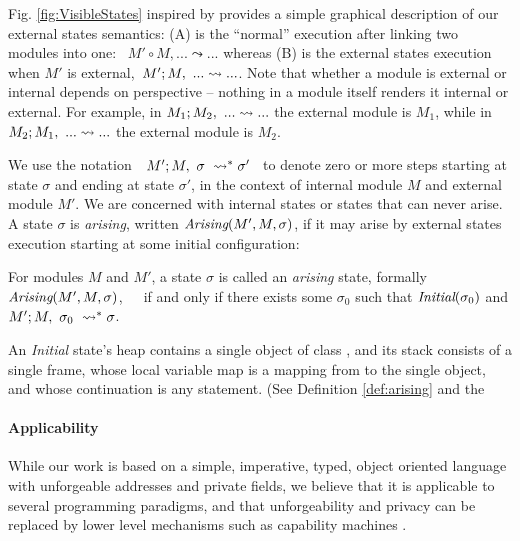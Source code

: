 Fig. \ref{fig:VisibleStates} inspired by  provides a simple graphical description of 
our external states semantics: (A) is the ``normal'' execution after 
linking two modules into one: \ $M' \circ M, ... \leadsto ...$ whereas (B) is the
 external states execution when $M'$ is external,\   $M' ; M,\ ... \leadsto ...$.
Note that whether a module is external or internal depends on %
perspective -- nothing in a module itself renders it internal or external. For example, in
 $M_1 ; M_2,\ ... \leadsto ...$ the external module is $M_1$,
  while in  $M_2 ; M_1,\ ... \leadsto ...$  the external module is $M_2$.

We  use the notation\ \  $M' ; M,\ \sigma\ \leadsto^* \sigma'$ \ 
to denote zero or more  steps starting at state $\sigma$ and ending at state $\sigma'$, in the context of internal module 
$M$ and external module $M'$.
We are \jm[]{not} concerned with internal states or states that can never arise.
{A state $\sigma$ is \emph{arising},}  written $\textit{Arising}(M', M, \sigma)$, {if it  may arise by external states} execution
starting at some initial configuration:



\begin{definition}
\label{def:arising}
For   modules $M$ and  $M'$, a %
 state $\sigma$ is 
called an \emph{arising} state, formally \ \ \ $\textit{Arising}(M', M, \sigma)$,\ \ \ 
if and only if there exists some $\sigma_0$ such that $\textit{Initial}(\sigma_0)$ and
$M' ; M,\ \sigma_0\ \leadsto^* \sigma$.
\end{definition}

An \emph{Initial} state's heap
contains a single object of class , and
its  stack   consists of a single frame, whose local variable map is a
mapping from \prg{this} to the single object, and whose continuation is  any statement.
(See Definition %
\ref{def:arising} and the 


\paragraph{Applicability} 
{While our work is based on 
  a simple, imperative, typed, object oriented}
language with unforgeable addresses and private fields, we believe
 that %
 it is applicable to several programming paradigms, and 
 that   unforgeability and privacy
 can be replaced 
 by lower level mechanisms such as capability machines \cite{vanproving,davis2019cheriabi}.

